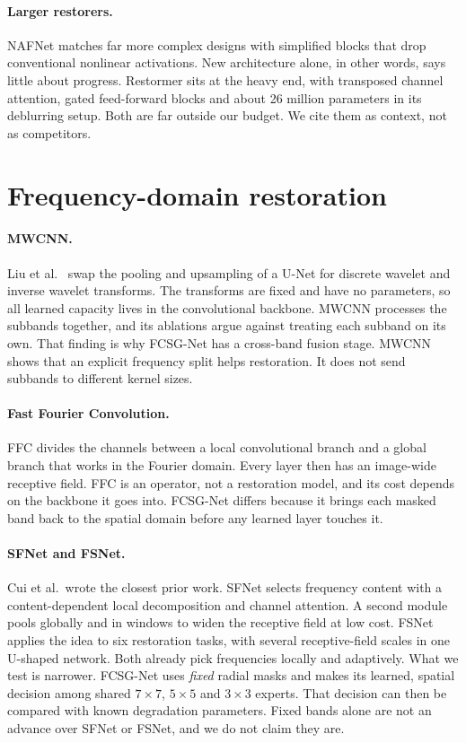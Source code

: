 \documentclass[12pt,a4paper,oneside]{NITR}
\newcommand{\fcsg}{FCSG-Net}
\begin{document}
\paragraph{Larger restorers.} NAFNet \cite{chen2022nafnet} matches far more
complex designs with simplified blocks that drop conventional nonlinear
activations. New architecture alone, in other words, says little about
progress. Restormer \cite{zamir2022restormer} sits at the heavy end, with
transposed channel attention, gated feed-forward blocks and about 26 million
parameters in its deblurring setup. Both are far outside our budget. We cite
them as context, not as competitors.

\section{Frequency-domain restoration}\label{sec:lit-freq}

\paragraph{MWCNN.} Liu et al.\ \cite{liu2018mwcnn} swap the pooling and
upsampling of a U-Net for discrete wavelet and inverse wavelet transforms.
The transforms are fixed and have no parameters, so all learned capacity
lives in the convolutional backbone. MWCNN processes the subbands together,
and its ablations argue against treating each subband on its own. That
finding is why \fcsg{} has a cross-band fusion stage. MWCNN shows that an
explicit frequency split helps restoration. It does not send subbands to
different kernel sizes.

\paragraph{Fast Fourier Convolution.} FFC \cite{chi2020ffc} divides the
channels between a local convolutional branch and a global branch that works
in the Fourier domain. Every layer then has an image-wide receptive field.
FFC is an operator, not a restoration model, and its cost depends on the
backbone it goes into. \fcsg{} differs because it brings each masked band
back to the spatial domain before any learned layer touches it.

\paragraph{SFNet and FSNet.} Cui et al.\ wrote the closest prior work.
SFNet \cite{cui2023sfnet} selects frequency content with a content-dependent
local decomposition and channel attention. A second module pools globally and
in windows to widen the receptive field at low cost. FSNet \cite{cui2024fsnet}
applies the idea to six restoration tasks, with several receptive-field
scales in one U-shaped network. Both already pick frequencies locally and
adaptively. What we test is narrower. \fcsg{} uses \emph{fixed} radial masks
and makes its learned, spatial decision among shared $7\times7$, $5\times5$
and $3\times3$ experts. That decision can then be compared with known
degradation parameters. Fixed bands alone are not an advance over SFNet or
FSNet, and we do not claim they are.
\end{document}

